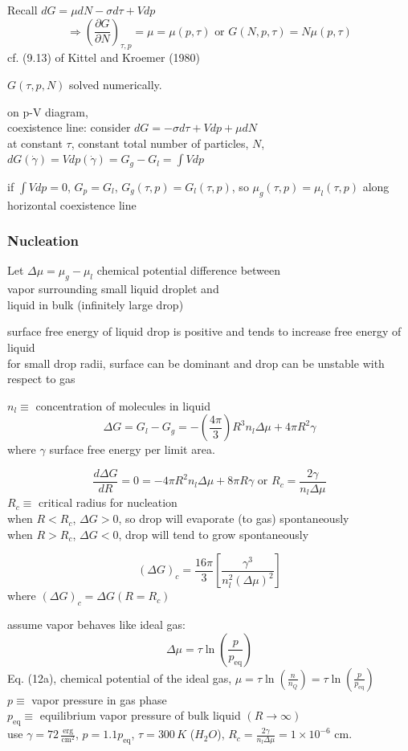 \documentclass[twoside]{amsart}
\theoremstyle{plain}
\theoremstyle{definition}
\begin{document}
Recall $dG = \mu dN - \sigma d\tau + Vdp$
\[
\Longrightarrow \left( \frac{ \partial G}{ \partial N} \right)_{\tau,p} = \mu = \mu(p,\tau) \text{ or } G(N,p,\tau) = N\mu(p,\tau)
\]
cf. (9.13) of Kittel and Kroemer (1980) \cite{CKittelHKroemer1980}

$G(\tau,p,N)$ solved numerically.

on p-V diagram, \\
\phantom{ \, } coexistence line: 
\phantom{ \, \quad } consider $dG = -\sigma d\tau + Vdp + \mu dN$ \\
\phantom{ \, \quad \, } at constant $\tau$, constant total number of particles, $N$, \\
$dG(\dot{\gamma}) = Vdp(\dot{\gamma}) = G_g - G_l = \int V dp$


if $\int V dp =0$, $G_p =G_l$, $G_g(\tau,p) = G_l(\tau,p)$, so $\mu_g(\tau,p) = \mu_l(\tau,p)$ along horizontal coexistence line

\subsubsection*{Nucleation}

Let $\Delta \mu = \mu_g - \mu_l$ chemical potential difference between \\
vapor surrounding small liquid droplet and \\
liquid in bulk (infinitely large drop) 

surface free energy of liquid drop is positive and tends to increase free energy of liquid \\
for small drop radii, surface can be dominant and drop can be unstable with respect to gas 

$n_l \equiv $ concentration of molecules in liquid 
\[
\Delta G = G_l -G_g = - \left( \frac{4\pi}{3} \right) R^3 n_l \Delta \mu + 4\pi R^2 \gamma 
\]
where $\gamma$ surface free energy per limit area.  

\[
\frac{d \Delta G}{dR} = 0 = -4\pi R^2 n_l \Delta \mu + 8 \pi R \gamma \text{ or } R_c = \frac{2\gamma }{ n_l \Delta \mu}
\]
$R_c \equiv $ critical radius for nucleation \\
when $R< R_c$, $\Delta G >0$, so drop will evaporate (to gas) spontaneously \\
when $R >R_c$, $\Delta G <0$, drop will tend to grow spontaneously

\[
(\Delta G)_c = \frac{16 \pi}{3} [ \frac{ \gamma^3}{ n_l^2 (\Delta \mu)^2 } ]
\]
where $(\Delta G)_c = \Delta G(R= R_c)$

assume vapor behaves like ideal gas: 
\[
\Delta \mu = \tau \ln{ \left( \frac{ p}{ p_{\text{eq}} } \right) }
\]
Eq. (12a), chemical potential of the ideal gas, $\mu = \tau \ln{ \left( \frac{n}{n_Q} \right)} = \tau \ln{ \left( \frac{p}{ p_{\text{eq}}} \right)}$ \\
\phantom{\quad \, } $p \equiv $ vapor pressure in gas phase \\ 
\phantom{\quad \, } $p_{\text{eq}} \equiv $ equilibrium vapor pressure of bulk liquid $(R \to \infty)$ \\
use $\gamma = 72 \, \frac{\text{erg}}{\text{cm}^2}$, $p =1.1 p_{\text{eq}}$, $\tau = 300 \, K$ ($H_2O$), $R_c = \frac{2\gamma}{n_l \Delta \mu } = 1\times 10^{-6}$ cm.  
\end{document}
